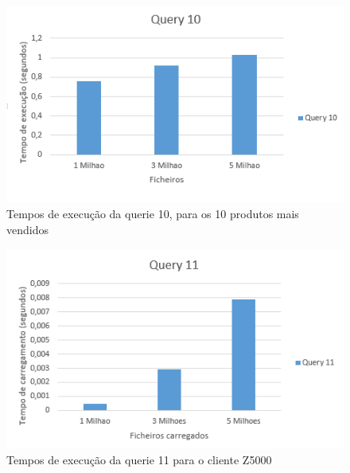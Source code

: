   	\begin{minipage}{0.45\linewidth}
  		\begin{figure}[H]
  			\includegraphics[width=\linewidth]{grafq10}
  			\caption{Tempos de execução da querie 10, para os 10 produtos mais vendidos}
  		\end{figure}
  	\end{minipage}
  	\hspace{0.05\linewidth}
  	\begin{minipage}{0.45\linewidth}
  		\begin{figure}[H]
  			\includegraphics[width=\linewidth]{grafq11}
  			\caption{Tempos de execução da querie 11 para o cliente Z5000}
  		\end{figure}
  	\end{minipage}
  	
